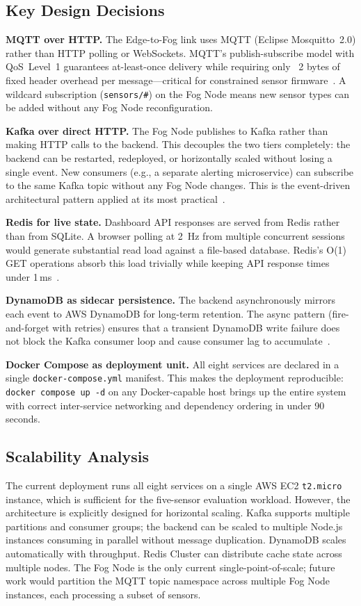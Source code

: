 \documentclass[conference]{IEEEtran}
\begin{document}
\subsection{Key Design Decisions}

\textbf{MQTT over HTTP.} The Edge-to-Fog link uses MQTT (Eclipse Mosquitto~2.0)
rather than HTTP polling or WebSockets. MQTT's publish-subscribe model with
QoS~Level~1 guarantees at-least-once delivery while requiring only ~2 bytes
of fixed header overhead per message---critical for constrained sensor
firmware~\cite{b6}. A wildcard subscription (\texttt{sensors/\#}) on the
Fog Node means new sensor types can be added without any Fog Node
reconfiguration.

\textbf{Kafka over direct HTTP.} The Fog Node publishes to Kafka rather than
making HTTP calls to the backend. This decouples the two tiers completely:
the backend can be restarted, redeployed, or horizontally scaled without
losing a single event. New consumers (e.g., a separate alerting microservice)
can subscribe to the same Kafka topic without any Fog Node changes. This is
the event-driven architectural pattern applied at its most practical~\cite{b9}.

\textbf{Redis for live state.} Dashboard API responses are served from Redis
rather than from SQLite. A browser polling at 2~Hz from multiple concurrent
sessions would generate substantial read load against a file-based database.
Redis's O(1) GET operations absorb this load trivially while keeping API
response times under 1\,ms~\cite{b11}.

\textbf{DynamoDB as sidecar persistence.} The backend asynchronously
mirrors each event to AWS DynamoDB for long-term retention. The async
pattern (fire-and-forget with retries) ensures that a transient DynamoDB
write failure does not block the Kafka consumer loop and cause consumer
lag to accumulate~\cite{b10}.

\textbf{Docker Compose as deployment unit.} All eight services are declared
in a single \texttt{docker-compose.yml} manifest. This makes the deployment
reproducible: \texttt{docker compose up -d} on any Docker-capable host
brings up the entire system with correct inter-service networking and
dependency ordering in under 90 seconds.

\subsection{Scalability Analysis}

The current deployment runs all eight services on a single AWS EC2
\texttt{t2.micro} instance, which is sufficient for the five-sensor
evaluation workload. However, the architecture is explicitly designed for
horizontal scaling. Kafka supports multiple partitions and consumer
groups; the backend can be scaled to multiple Node.js instances consuming
in parallel without message duplication. DynamoDB scales automatically with
throughput. Redis Cluster can distribute cache state across multiple nodes.
The Fog Node is the only current single-point-of-scale; future work would
partition the MQTT topic namespace across multiple Fog Node instances,
each processing a subset of sensors.
\end{document}
